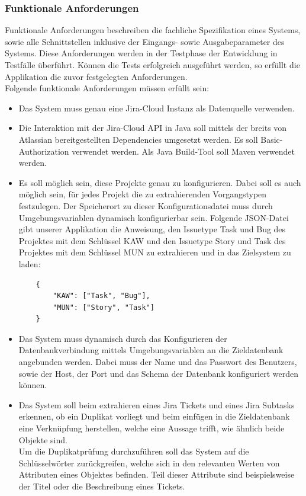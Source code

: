 \subsubsection{Funktionale Anforderungen}
Funktionale Anforderungen beschreiben die fachliche Spezifikation eines Systems, sowie alle Schnittstellen inklusive der Eingangs- sowie Ausgabeparameter des Systems. Diese Anforderungen werden in der Testphase der Entwicklung in Testfälle überführt. Können die Tests erfolgreich ausgeführt werden, so erfüllt die Applikation die zuvor festgelegten Anforderungen.\\
Folgende funktionale Anforderungen müssen erfüllt sein:
\begin{itemize}
  \item Das System muss genau eine Jira-Cloud Instanz als Datenquelle verwenden. 
  \item Die Interaktion mit der Jira-Cloud API in Java soll mittels der breits von Atlassian bereitgestellten Dependencies umgesetzt werden. Es soll Basic-Authorization verwendet werden. Als Java Build-Tool soll Maven verwendet werden.
  \item Es soll möglich sein, diese Projekte genau zu konfigurieren. Dabei soll es auch möglich sein, für jedes Projekt die zu extrahierenden Vorgangstypen festzulegen. Der Speicherort zu dieser Konfigurationsdatei muss durch Umgebungsvariablen dynamisch konfigurierbar sein. Folgende JSON-Datei gibt unserer Applikation die Anweisung, den Issuetype Task und Bug des Projektes mit dem Schlüssel KAW und den Issuetype Story und Task des Projektes mit dem Schlüssel MUN zu extrahieren und in das Zielsystem zu laden:
    \begin{verbatim}
    {
        "KAW": ["Task", "Bug"],
        "MUN": ["Story", "Task"]
    }
    \end{verbatim}
  \item Das System muss dynamisch durch das Konfigurieren der Datenbankverbindung mittels Umgebungsvariablen an die Zieldatenbank angebunden werden. Dabei muss der Name und das Passwort des Benutzers, sowie der Host, der Port und das Schema der Datenbank konfiguriert werden können.
  \item Das System soll beim extrahieren eines Jira Tickets und eines Jira Subtasks erkennen, ob ein Duplikat vorliegt und beim einfügen in die Zieldatenbank eine Verknüpfung herstellen, welche eine Aussage trifft, wie ähnlich beide Objekte sind.\\
  Um die Duplikatprüfung durchzuführen soll das System auf die Schlüsselwörter zurückgreifen, welche sich in den relevanten Werten von Attributen eines Objektes befinden. Teil dieser Attribute sind beispielsweise der Titel oder die Beschreibung eines Tickets.

\end{itemize}
